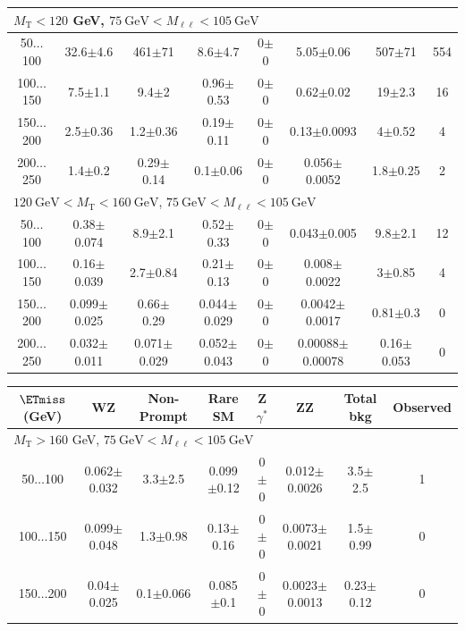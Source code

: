 \begin{landscape}
\begin{table}
\begin{center}
\begin{tabular}{| c | c c c c c c c | }
\hline\hline
\multicolumn{8}{l}{$M_{\text{T}} < 120$ GeV, $75~\mathrm{GeV} < M_{\ell\ell} < 105~\mathrm{GeV}$}\\\hline\hline
50$\dots$100&32.6$\pm$4.6&461$\pm$71&8.6$\pm$4.7&0$\pm$0&5.05$\pm$0.06&507$\pm$71&554\\
100$\dots$150&7.5$\pm$1.1&9.4$\pm$2&0.96$\pm$0.53&0$\pm$0&0.62$\pm$0.02&19$\pm$2.3&16\\
150$\dots$200&2.5$\pm$0.36&1.2$\pm$0.36&0.19$\pm$0.11&0$\pm$0&0.13$\pm$0.0093&4$\pm$0.52&4\\
200$\dots$250&1.4$\pm$0.2&0.29$\pm$0.14&0.1$\pm$0.06&0$\pm$0&0.056$\pm$0.0052&1.8$\pm$0.25&2\\
\hline\hline
\multicolumn{8}{l}{$120~\mathrm{GeV} < M_{\text{T}} < 160~\mathrm{GeV}$, $75~\mathrm{GeV} < M_{\ell\ell} < 105~\mathrm{GeV}$}\\\hline\hline
50$\dots$100&0.38$\pm$0.074&8.9$\pm$2.1&0.52$\pm$0.33&0$\pm$0&0.043$\pm$0.005&9.8$\pm$2.1&12\\
100$\dots$150&0.16$\pm$0.039&2.7$\pm$0.84&0.21$\pm$0.13&0$\pm$0&0.008$\pm$0.0022&3$\pm$0.85&4\\
150$\dots$200&0.099$\pm$0.025&0.66$\pm$0.29&0.044$\pm$0.029&0$\pm$0&0.0042$\pm$0.0017&0.81$\pm$0.3&0\\
200$\dots$250&0.032$\pm$0.011&0.071$\pm$0.029&0.052$\pm$0.043&0$\pm$0&0.00088$\pm$0.00078&0.16$\pm$0.053&0\\
\hline\hline
\end{tabular}
\end{center}
\end{table}
\begin{table}
\begin{center}
\begin{tabular}{| c | c c c c c c c | }\hline\hline
$\ETmiss$ (GeV) & WZ & Non-Prompt & Rare SM & Z$\gamma^*$ & ZZ & Total bkg & Observed\\\hline\hline
\multicolumn{8}{l}{$M_{\text{T}} > 160$ GeV, $75~\mathrm{GeV} < M_{\ell\ell} < 105~\mathrm{GeV}$}\\\hline\hline
50$\dots$100&0.062$\pm$0.032&3.3$\pm$2.5&0.099$\pm$0.12&0$\pm$0&0.012$\pm$0.0026&3.5$\pm$2.5&1\\
100$\dots$150&0.099$\pm$0.048&1.3$\pm$0.98&0.13$\pm$0.16&0$\pm$0&0.0073$\pm$0.0021&1.5$\pm$0.99&0\\
150$\dots$200&0.04$\pm$0.025&0.1$\pm$0.066&0.085$\pm$0.1&0$\pm$0&0.0023$\pm$0.0013&0.23$\pm$0.12&0\\

\end{tabular}
\end{center}
\end{table}
\end{landscape}
